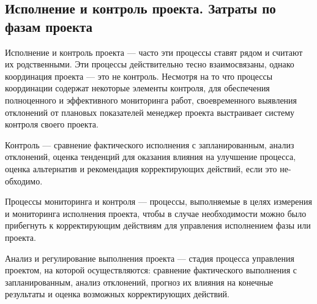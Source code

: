 \subsection{Исполнение и контроль проекта. Затраты по фазам проекта}

Исполнение и контроль проекта --- часто эти процессы ставят рядом и считают их родственными.
Эти процессы действительно тесно взаи­мосвязаны, однако координация проекта --- это не контроль.
Несмотря на то что процессы координации содержат некоторые элементы конт­роля, для обеспечения полноценного и эффективного мониторинга работ, своевременного выявления отклонений от плановых показателей менеджер проекта выстраивает систему контроля своего проекта.

Контроль --- сравнение фактического исполнения с запланированным, анализ отклонений, оценка тенденций для оказания влияния на улучшение процесса, оценка альтернатив и рекомендация корректирующих действий, если это не­обходимо.

Процессы мониторинга и контроля --- процессы, выполняемые в целях из­мерения и мониторинга исполнения проекта, чтобы в случае необходимости можно было прибегнуть к корректирующим действиям для управления исполнением фазы или проекта.

Анализ и регулирование выполнения проекта --- стадия процесса управ­ления проектом, на которой осуществляются: сравнение фактического выпол­нения с запланированным, анализ отклонений, прогноз их влияния на конеч­ные результаты и оценка возможных корректирующих действий.